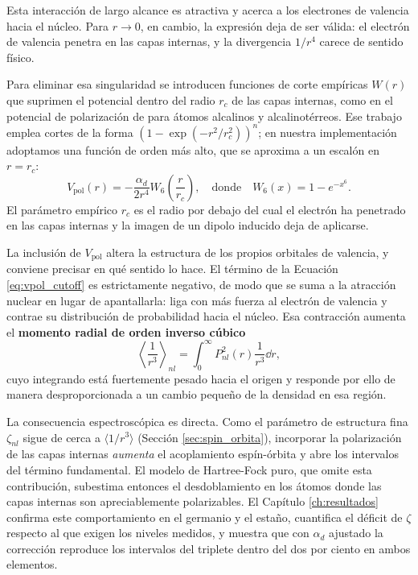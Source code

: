 Esta interacción de largo alcance es atractiva y acerca a los electrones de valencia hacia el núcleo. Para $r \to 0$, en cambio, la expresión deja de ser válida: el electrón de valencia penetra en las capas internas, y la divergencia $1/r^4$ carece de sentido físico.

Para eliminar esa singularidad se introducen funciones de corte empíricas $W(r)$ que suprimen el potencial dentro del radio $r_c$ de las capas internas, como en el potencial de polarización de \textcite{Muller1984} para átomos alcalinos y alcalinotérreos. Ese trabajo emplea cortes de la forma $(1 - \exp(-r^2/r_c^2))^n$; en nuestra implementación adoptamos una función de orden más alto, que se aproxima a un escalón en $r = r_c$:
\begin{equation}
    \label{eq:vpol_cutoff}
    V_{\text{pol}}(r) = -\frac{\alpha_d}{2 r^4} W_6\left(\frac{r}{r_c}\right), \quad \text{donde} \quad W_6(x) = 1 - e^{-x^6}.
\end{equation}
El parámetro empírico $r_c$ es el radio por debajo del cual el electrón ha penetrado en las capas internas y la imagen de un dipolo inducido deja de aplicarse.

La inclusión de $V_{\text{pol}}$ altera la estructura de los propios orbitales de valencia, y conviene precisar en qué sentido lo hace. El término de la Ecuación \eqref{eq:vpol_cutoff} es estrictamente negativo, de modo que se suma a la atracción nuclear en lugar de apantallarla: liga con más fuerza al electrón de valencia y contrae su distribución de probabilidad hacia el núcleo. Esa contracción aumenta el \textbf{momento radial de orden inverso cúbico}
\begin{equation}
    \left\langle \frac{1}{r^3} \right\rangle_{nl} = \int_0^\infty P_{nl}^2(r) \frac{1}{r^3} \dd{r},
\end{equation}
cuyo integrando está fuertemente pesado hacia el origen y responde por ello de manera desproporcionada a un cambio pequeño de la densidad en esa región.

La consecuencia espectroscópica es directa. Como el parámetro de estructura fina $\zeta_{nl}$ sigue de cerca a $\langle 1/r^3 \rangle$ (Sección \ref{sec:spin_orbita}), incorporar la polarización de las capas internas \textit{aumenta} el acoplamiento espín-órbita y abre los intervalos del término fundamental. El modelo de Hartree-Fock puro, que omite esta contribución, subestima entonces el desdoblamiento en los átomos donde las capas internas son apreciablemente polarizables. El Capítulo \ref{ch:resultados} confirma este comportamiento en el germanio y el estaño, cuantifica el déficit de $\zeta$ respecto al que exigen los niveles medidos, y muestra que con $\alpha_d$ ajustado la corrección reproduce los intervalos del triplete dentro del dos por ciento en ambos elementos.


